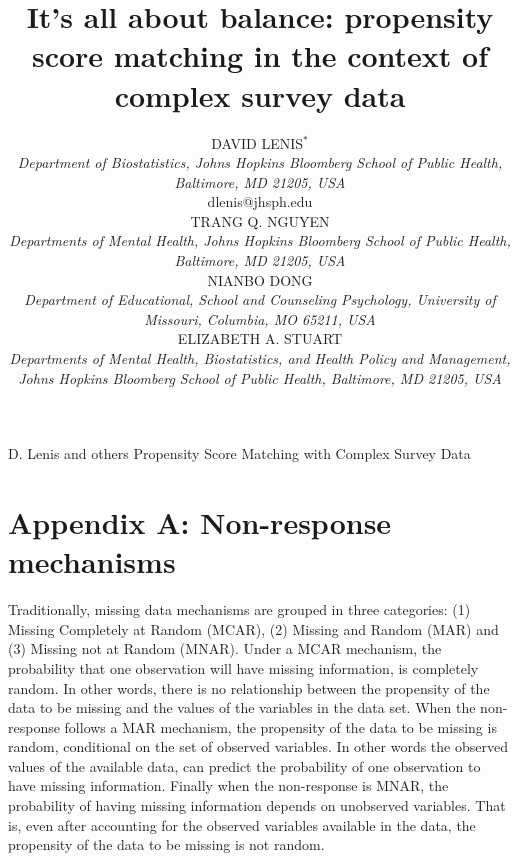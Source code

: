 \documentclass[oupdraft]{bio}
\begin{document}
\title{It's all about balance: propensity score matching in the context of complex survey data}

\author{DAVID LENIS$^\ast$\\
\textit{Department of Biostatistics, Johns Hopkins Bloomberg School of Public Health, Baltimore, MD 21205, USA}\\
{dlenis@jhsph.edu}\\
TRANG Q. NGUYEN\\
\textit{Departments of Mental Health, Johns Hopkins Bloomberg School of Public Health, Baltimore, MD 21205, USA}\\
NIANBO DONG\\
\textit{Department of Educational, School and Counseling Psychology, University of Missouri, Columbia, MO 65211, USA}\\
ELIZABETH A. STUART\\
\textit{Departments of Mental Health, Biostatistics, and Health Policy and Management, Johns Hopkins Bloomberg School of Public Health, Baltimore, MD 21205, USA}}

\markboth%
{D. Lenis and others}
{Propensity Score Matching with Complex Survey Data}
\maketitle



\section*{Appendix A: Non-response mechanisms}
Traditionally, missing data mechanisms are grouped in three categories: (1) Missing Completely at Random (MCAR), (2) Missing and Random (MAR) and (3) Missing not at Random (MNAR). Under a MCAR mechanism, the probability that one observation will have missing information, is completely random. In other words, there is no relationship between the propensity of the data to be missing and the values of the variables in the data set. When the non-response follows a MAR mechanism, the propensity of the data to be missing is random, conditional on the set of observed variables. In other words the observed values of the available data, can predict the probability of one observation to have missing information. Finally when the non-response is MNAR, the probability of having missing information depends on unobserved variables. That is, even after accounting for the observed variables available in the data, the propensity of the data to be missing is not random.    
\end{document}
